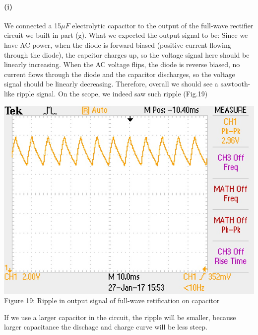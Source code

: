 \documentclass[]{article}
\begin{document}
	\paragraph{ (i)} 	
	We connected a 15$\mu F$ electrolytic capacitor to the output of the full-wave rectifier circuit we built in part (g). What we expected the output signal to be: Since we have AC power, when the diode is forward biased (positive current flowing through the diode), the capcitor charges up, so the voltage signal here should be linearly increasing. When the AC voltage flips, the diode is reverse biased, no current flows through the diode and the capacitor discharges, so the voltage signal should be linearly decreasing. Therefore, overall we should see a sawtooth-like ripple signal. On the scope, we indeed saw such ripple (Fig.19)
		\begin{center}
			\includegraphics[scale=0.8]{i_ripple}\\
			Figure 19: Ripple in output signal of full-wave retification on capacitor
		\end{center}
	If we use a larger capacitor in the circuit, the ripple will be smaller, because larger capacitance the dischage and charge curve will be less steep.
\end{document}
